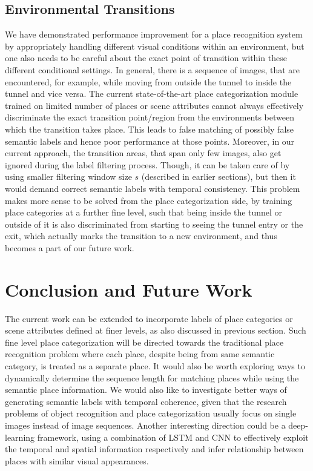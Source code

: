 \documentclass[letterpaper, 10 pt, conference]{ieeeconf}  %
\begin{document}
\subsection{Environmental Transitions}
We have demonstrated performance improvement for a place recognition system by appropriately handling different visual conditions within an environment, but one also needs to be careful about the exact point of transition within these different conditional settings. In general, there is a sequence of images, that are encountered, for example, while moving from outside the tunnel to inside the tunnel and vice versa. The current state-of-the-art place categorization module trained on limited number of places or scene attributes cannot always effectively discriminate the exact transition point/region from the environments between which the transition takes place. This leads to false matching of possibly false semantic labels and hence poor performance at those points. Moreover, in our current approach, the transition areas, that span only few images, also get ignored during the label filtering process. Though, it can be taken care of by using smaller filtering window size $s$ (described in earlier sections), but then it would demand correct semantic labels with temporal consistency. This problem makes more sense to be solved from the place categorization side, by training place categories at a further fine level, such that being inside the tunnel or outside of it is also discriminated from starting to seeing the tunnel entry or the exit, which actually marks the transition to a new environment, and thus becomes a part of our future work.


\section{Conclusion and Future Work}
The current work can be extended to incorporate labels of place categories or scene attributes defined at finer levels, as also discussed in previous section. Such fine level place categorization will be directed towards the traditional place recognition problem where each place, despite being from same semantic category, is treated as a separate place. It would also be worth exploring ways to dynamically determine the sequence length for matching places while using the semantic place information.  We would also like to investigate better ways of generating semantic labels with temporal coherence, given that the research problems of object recognition and place categorization usually focus on single images instead of image sequences. Another interesting direction could be a deep-learning framework, using a combination of LSTM and CNN to effectively exploit the temporal and spatial information respectively and infer relationship between places with similar visual appearances.
\end{document}

